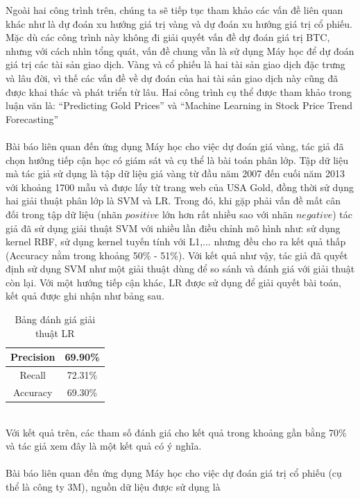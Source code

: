 Ngoài hai công trình trên, chúng ta sẽ tiếp tục tham khảo các vấn đề liên quan 
khác như là dự đoán xu hướng giá trị vàng và dự đoán xu hướng giá trị cổ phiếu.
Mặc dù các công trình này không đi giải quyết vấn đề dự đoán giá trị BTC, nhưng 
với cách nhìn tổng quát, vấn đề chung vẫn là sử dụng Máy học để dự đoán giá trị 
các tài sản giao dịch. Vàng và cổ phiếu là hai tài sản giao dịch đặc trưng và lâu 
đời, vì thế các vấn đề về dự đoán của hai tài sản giao dịch này cũng đã được 
khai thác và phát triển từ lâu. Hai công trình cụ thể được tham khảo trong luận văn là: 
``Predicting Gold Prices'' \cite{PredictingGoldPrices} và 
``Machine Learning in Stock Price Trend Forecasting'' 
\cite{StockPriceTrendForecasting} \\\\ 
Bài báo \cite{PredictingGoldPrices} liên quan đến ứng dụng Máy học cho việc dự đoán 
giá vàng, tác giả đã chọn hướng tiếp cận học có giám sát và cụ thể là bài toán 
phân lớp. Tập dữ liệu mà tác giả sử dụng là tập dữ liệu giá vàng từ đầu năm 2007 
đến cuối năm 2013 với khoảng 1700 mẫu và được lấy từ trang web của USA Gold, 
đồng thời sử dụng hai giải thuật phân lớp là SVM và LR.
Trong đó, khi gặp phải vấn đề mất cân đối trong tập dữ liệu (nhãn $positive$ 
lớn hơn rất nhiều sao với nhãn $negative$) tác giả đã sử dụng giải thuật SVM 
với nhiều lần điều chỉnh mô hình như: sử dụng kernel RBF, sử dụng kernel tuyến 
tính với L1,... nhưng đều cho ra kết quả thấp (Accuracy nằm trong khoảng 50\% 
- 51\%). Với kết quả như vậy, tác giả đã quyết định sử dụng SVM như một giải 
thuật dùng để so sánh và đánh giá với giải thuật còn lại. Với một hướng tiếp 
cận khác, LR được sử dụng để giải quyết bài toán, kết quả được ghi nhận như 
bảng sau.
\begin{table}[h]
\centering
\begin{tabular}{ |c|c| }
\hline
Precision & 69.90\% \\
\hline
Recall & 72.31\% \\
\hline
Accuracy & 69.30\% \\
\hline
\end{tabular}
\caption{Bảng đánh giá giải thuật LR}
\end{table}\\
Với kết quả trên, các tham số đánh giá cho kết quả trong khoảng gần bằng 70\% 
và tác giả xem đây là một kết quả có ý nghĩa.\\\\
Bài báo \cite{StockPriceTrendForecasting} liên quan đến ứng dụng Máy học cho việc 
dự đoán giá trị cổ phiếu (cụ thể là công ty 3M), nguồn dữ liệu được sử dụng là 
